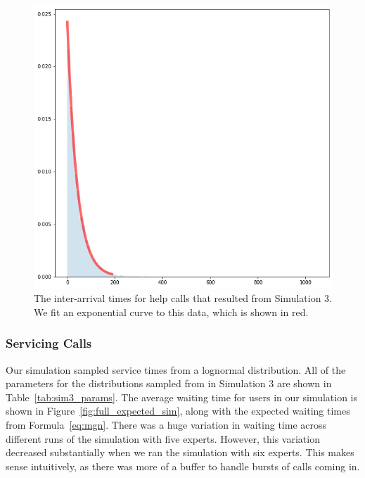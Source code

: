 \begin{figure}[H]
  \includegraphics[width=\textwidth]{figures/montecarlo/call_times.png}
  \caption{
    The inter-arrival times for help calls that resulted from Simulation 3.
    We fit an exponential curve to this data, which is shown in red.
  }\label{fig:step_patience}
\end{figure}

\subsubsection{Servicing Calls}

Our simulation sampled service times from a lognormal distribution.
All of the parameters for the distributions sampled from in Simulation 3 are
shown in Table~\ref{tab:sim3_params}.
The average waiting time for users in our simulation is shown in
Figure~\ref{fig:full_expected_sim}, along with the expected waiting times from
Formula~\ref{eq:mgn}.
There was a huge variation in waiting time across different runs of the
simulation with five experts.
However, this variation decreased substantially when we ran the simulation with
six experts.
This makes sense intuitively, as there was more of a buffer to handle bursts of
calls coming in.


